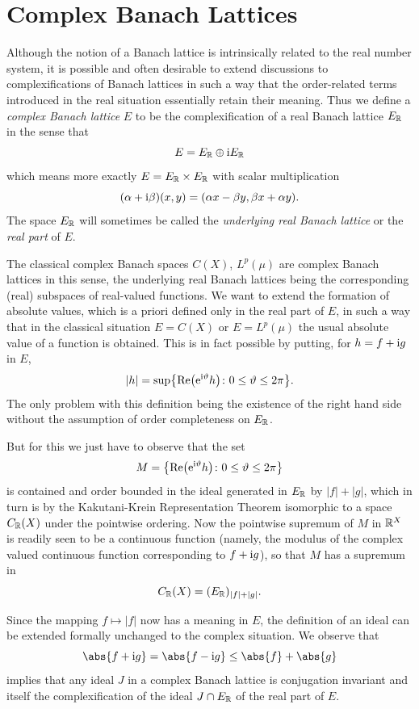 \section{Complex Banach Lattices}\label{sec:c1-7}%
Although the notion of a Banach lattice is intrinsically related to the real number system, it is possible and often desirable to extend discussions to complexifications of Banach lattices in such a way that the order-related terms introduced in the real situation essentially retain their meaning.
Thus we define a \emph{complex Banach lattice} $ E $ to be the complexification of a real Banach lattice $ E_{\mathbb{R}} $ in the sense that
\[
E = E_{\mathbb{R}} \oplus \mathrm{i} E_{\mathbb{R}}
\]
which means more exactly $ E = E_{\mathbb{R}} \times E_{\mathbb{R}} $ with scalar multiplication 
%
\[
	 (\alpha+\mathrm{i}\beta)(x,y) = (\alpha x-\beta y,\beta x+\alpha y)  .
\]
%
The space $ E_{\mathbb{R}} $ will sometimes be called the \emph{underlying real Banach lattice} or the \emph{real part} of\/ $ E $.

The classical complex Banach spaces $ C(X) $, $ L^{p}(\mu) $ are complex Banach lattices in this sense, the underlying real Banach lattices being the corresponding (real) subspaces of real-valued functions.
We want to extend the formation of absolute values, which is a priori defined only in the real part of\/ $ E $, in such a way that in the classical situation $ E = C(X) $ or $ E = L^{p}(\mu) $ the usual absolute value of a function is obtained.
This is in fact possible by putting, for $ h = f + \mathrm{i} g $ in $ E $,
\[
	|h| = \sup \mleft\{ \Re \mleft(  \eu^{\iu \theta} h \mright) \colon 0 \leq \theta \leq 2\pi \mright\}.
\]
The only problem with this definition being the existence of the right hand side without the assumption of order completeness on $ E_{\mathbb{R}} $.

But for this we just have to observe that the set 
\[
M = \mleft\{ \Re \mleft( \eu^{\im\theta}h \mright) \colon 0 \leq \theta \leq 2\pi \mright\}
\]
is contained and order bounded in the ideal generated in $ E_{\mathbb{R}} $ by $ |f| + |g| $, which in turn is by the Kakutani-Krein Representation Theorem isomorphic to a space $ C_{\mathbb{R}}(X) $ under the pointwise ordering.
Now the pointwise supremum of\/ $ M $ in $ \mathbb{R}^{X} $ is readily seen to be a continuous function (namely, the modulus of the complex valued continuous function corresponding to $ f + \mathrm{i} g $), so that $ M $ has a supremum in 
%
\[
	C_{\mathbb{R}}(X) = (E_{\mathbb{R}})_{|f|+|g|} .
\]
%

Since the mapping $ f \mapsto |f| $ now has a meaning in $ E $, the definition of an ideal can be extended formally unchanged to the complex situation.
We observe that 
\[ 
    \abs{f + \iu g} = \abs{f - \iu g} \leq   \abs{f}   +   \abs{g}  
\]
implies that any ideal $ J $ in a complex Banach lattice 
is conjugation invariant and itself the complexification of the ideal $ J \cap E_{\mathbb{R}} $ of the real part of\/ $ E $.

